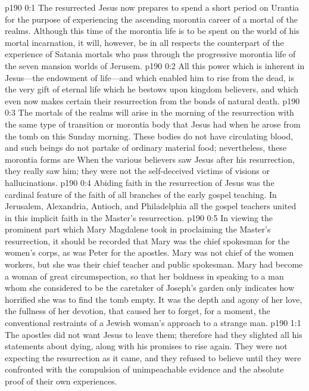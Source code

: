 \author{Midwayer Commission}
\vs p190 0:1 The resurrected Jesus now prepares to spend a short period on Urantia for the purpose of experiencing the ascending morontia career of a mortal of the realms. Although this time of the morontia life is to be spent on the world of his mortal incarnation, it will, however, be in all respects the counterpart of the experience of Satania mortals who pass through the progressive morontia life of the seven mansion worlds of Jerusem.
\vs p190 0:2 All this power which is inherent in Jesus---the endowment of life---and which enabled him to rise from the dead, is the very gift of eternal life which he bestows upon kingdom believers, and which even now makes certain their resurrection from the bonds of natural death.
\vs p190 0:3 The mortals of the realms will arise in the morning of the resurrection with the same type of transition or morontia body that Jesus had when he arose from the tomb on this Sunday morning. These bodies do not have circulating blood, and such beings do not partake of ordinary material food; nevertheless, these morontia forms are  When the various believers saw Jesus after his resurrection, they really saw him; they were not the self\hyp{}deceived victims of visions or hallucinations.\plusone
\vs p190 0:4 Abiding faith in the resurrection of Jesus was the cardinal feature of the faith of all branches of the early gospel teaching. In Jerusalem, Alexandria, Antioch, and Philadelphia all the gospel teachers united in this implicit faith in the Master’s resurrection.
\pc \vs p190 0:5 In viewing the prominent part which Mary Magdalene took in proclaiming the Master’s resurrection, it should be recorded that Mary was the chief spokesman for the women’s corps, as was Peter for the apostles. Mary was not chief of the women workers, but she was their chief teacher and public spokesman. Mary had become a woman of great circumspection, so that her boldness in speaking to a man whom she considered to be the caretaker of Joseph’s garden only indicates how horrified she was to find the tomb empty. It was the depth and agony of her love, the fullness of her devotion, that caused her to forget, for a moment, the conventional restraints of a Jewish woman’s approach to a strange man.
\vs p190 1:1 The apostles did not want Jesus to leave them; therefore had they slighted all his statements about dying, along with his promises to rise again. They were not expecting the resurrection as it came, and they refused to believe until they were confronted with the compulsion of unimpeachable evidence and the absolute proof of their own experiences.
